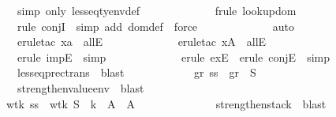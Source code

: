 \begin{isabellebody}
\ \ \ \ \ \ \ \ \ \ \ \ \isamarkupfalse \ {\isacharparenleft}simp\ only{\isacharcolon}\ lesseq{\isacharunderscore}tyenv{\isacharunderscore}def{\isacharparenright}\isanewline
\ \ \ \ \ \ \ \ \ \ \ \ \isamarkupfalse \ {\isacharparenleft}frule\ lookup{\isacharunderscore}dom{\isacharparenright}\isanewline
\ \ \ \ \ \ \ \ \ \ \ \ \isamarkupfalse \ {\isacharparenleft}rule\ conjI{\isacharparenright}\ \isamarkupfalse \ {\isacharparenleft}simp\ add{\isacharcolon}\ dom{\isacharunderscore}def{\isacharparenright}\ \isamarkupfalse \ force\isanewline
\ \ \ \ \ \ \ \ \ \ \ \ \isamarkupfalse \ auto\isanewline
\ \ \ \ \ \ \ \ \ \ \ \ \isamarkupfalse \ {\isacharparenleft}erule{\isacharunderscore}tac\ x{\isacharequal}a\ \ allE{\isacharparenright}\isanewline
\ \ \ \ \ \ \ \ \ \ \ \ \isamarkupfalse \ {\isacharparenleft}erule{\isacharunderscore}tac\ x{\isacharequal}A\ \ allE{\isacharparenright}\isanewline
\ \ \ \ \ \ \ \ \ \ \ \ \isamarkupfalse \ {\isacharparenleft}erule\ impE{\isacharparenright}\ \isamarkupfalse \ simp\isanewline
\ \ \ \ \ \ \ \ \ \ \ \ \isamarkupfalse \ {\isacharparenleft}erule\ exE{\isacharparenright}\ \isamarkupfalse \ {\isacharparenleft}erule\ conjE{\isacharparenright}\ \isamarkupfalse \ simp\ \isanewline
\ \ \ \ \ \ \ \ \ \ \ \ \isamarkupfalse \ lesseq{\isacharunderscore}prec{\isacharunderscore}trans\ \isamarkupfalse \ blast\ \isamarkupfalse \isanewline
\ \ \ \ \ \ \ \ \ \ \isamarkupfalse \ gr\ ss{}\ \isamarkupfalse \ gr{}{\isacharcolon}\ {\isachardoublequoteopen}{\isasymGamma}{\isacharsemicolon}\ {\isacharquery}S{}\ {\isasymturnstile}\ {\isasymrho}{\isachardoublequoteclose}\ \isanewline
\ \ \ \ \ \ \ \ \ \ \ \ \isamarkupfalse \ strengthen{\isacharunderscore}value{\isacharunderscore}env\ \isamarkupfalse \ blast\ \isamarkupfalse \isanewline
\ \ \ \ \ \ \ \ \ \ \isamarkupfalse \ wt{\isacharunderscore}k\ ss{}\ \isamarkupfalse \ wtk{}{\isacharcolon}\ {\isachardoublequoteopen}{\isacharquery}S{}\ {\isasymturnstile}\ k\ {\isacharcolon}\ A{\isacharprime}\ {\isasymRightarrow}\ A{\isachardoublequoteclose}\ \isanewline
\ \ \ \ \ \ \ \ \ \ \ \ \isamarkupfalse \ strengthen{\isacharunderscore}stack\ \isamarkupfalse \ blast\ \isamarkupfalse \isanewline

\end{isabellebody}
